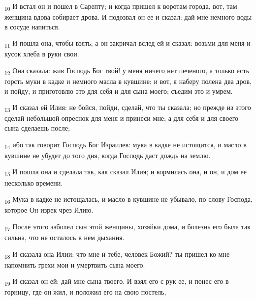 \begin{tcolorbox}
\textsubscript{10} И встал он и пошел в Сарепту; и когда пришел к воротам города, вот, там женщина вдова собирает дрова. И подозвал он ее и сказал: дай мне немного воды в сосуде напиться.
\end{tcolorbox}
\begin{tcolorbox}
\textsubscript{11} И пошла она, чтобы взять; а он закричал вслед ей и сказал: возьми для меня и кусок хлеба в руки свои.
\end{tcolorbox}
\begin{tcolorbox}
\textsubscript{12} Она сказала: жив Господь Бог твой! у меня ничего нет печеного, а только есть горсть муки в кадке и немного масла в кувшине; и вот, я наберу полена два дров, и пойду, и приготовлю это для себя и для сына моего; съедим это и умрем.
\end{tcolorbox}
\begin{tcolorbox}
\textsubscript{13} И сказал ей Илия: не бойся, пойди, сделай, что ты сказала; но прежде из этого сделай небольшой опреснок для меня и принеси мне; а для себя и для своего сына сделаешь после;
\end{tcolorbox}
\begin{tcolorbox}
\textsubscript{14} ибо так говорит Господь Бог Израилев: мука в кадке не истощится, и масло в кувшине не убудет до того дня, когда Господь даст дождь на землю.
\end{tcolorbox}
\begin{tcolorbox}
\textsubscript{15} И пошла она и сделала так, как сказал Илия; и кормилась она, и он, и дом ее несколько времени.
\end{tcolorbox}
\begin{tcolorbox}
\textsubscript{16} Мука в кадке не истощалась, и масло в кувшине не убывало, по слову Господа, которое Он изрек чрез Илию.
\end{tcolorbox}
\begin{tcolorbox}
\textsubscript{17} После этого заболел сын этой женщины, хозяйки дома, и болезнь его была так сильна, что не осталось в нем дыхания.
\end{tcolorbox}
\begin{tcolorbox}
\textsubscript{18} И сказала она Илии: что мне и тебе, человек Божий? ты пришел ко мне напомнить грехи мои и умертвить сына моего.
\end{tcolorbox}
\begin{tcolorbox}
\textsubscript{19} И сказал он ей: дай мне сына твоего. И взял его с рук ее, и понес его в горницу, где он жил, и положил его на свою постель,
\end{tcolorbox}
